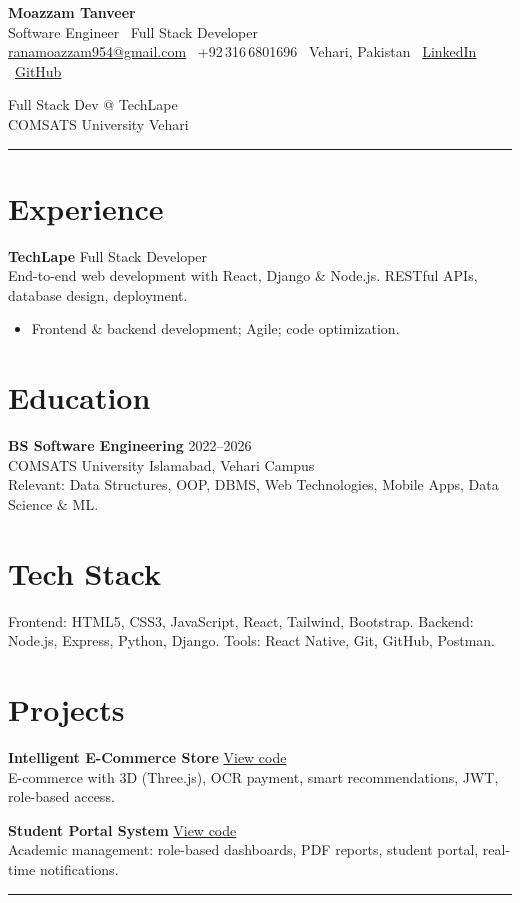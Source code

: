 \documentclass[11pt,a4paper]{article}
\makeatletter
\newcommand{\cvheader}{%
  \noindent
  \begin{minipage}[t]{0.7\textwidth}
    {\LARGE\bfseries\color{primary} Moazzam Tanveer}\\[0.25em]
    {\large Software Engineer \textbar\ Full Stack Developer}\\[0.5em]
    {\small
      \href{mailto:ranamoazzam954@gmail.com}{ranamoazzam954@gmail.com}
      \textbar\ +92\,316\,6801696
      \textbar\ Vehari, Pakistan
      \textbar\ \href{https://linkedin.com/in/rana-moazzam-077108258}{LinkedIn}
      \textbar\ \href{https://github.com/itsMoazzam}{GitHub}
    }
  \end{minipage}%
  \hfill
  \begin{minipage}[t]{0.25\textwidth}
    \raggedleft
    {\small Full Stack Dev @ TechLape}\\[0.2em]
    {\small COMSATS University Vehari}
  \end{minipage}
  \vspace{0.6em}
  \noindent\rule{\textwidth}{0.8pt}
  \vspace{0.8em}
}
\makeatother
\begin{document}
\cvheader

\section*{Experience}
\textbf{TechLape} \hfill Full Stack Developer\\
End-to-end web development with React, Django \& Node.js. RESTful APIs, database design, deployment.
\begin{itemize}
  \item Frontend \& backend development; Agile; code optimization.
\end{itemize}

\section*{Education}
\textbf{BS Software Engineering} \hfill 2022--2026\\
COMSATS University Islamabad, Vehari Campus\\
Relevant: Data Structures, OOP, DBMS, Web Technologies, Mobile Apps, Data Science \& ML.

\section*{Tech Stack}
Frontend: HTML5, CSS3, JavaScript, React, Tailwind, Bootstrap. \quad
Backend: Node.js, Express, Python, Django. \quad
Tools: React Native, Git, GitHub, Postman.

\section*{Projects}
\textbf{Intelligent E-Commerce Store} \quad \href{https://github.com/itsMoazzam/AI-Powered-E-Commerce-store}{View code}\\
E-commerce with 3D (Three.js), OCR payment, smart recommendations, JWT, role-based access.

\textbf{Student Portal System} \quad \href{https://github.com/itsMoazzam/Student-portal}{View code}\\
Academic management: role-based dashboards, PDF reports, student portal, real-time notifications.

\vfill
\noindent\rule{\textwidth}{0.4pt}
\end{document}
